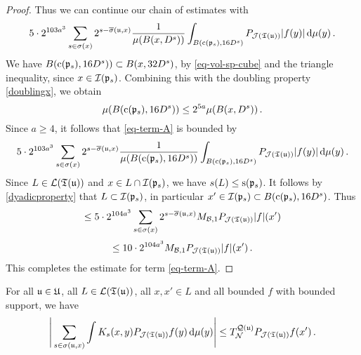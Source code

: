 \begin{proof}
    Thus we can continue our chain of estimates with
    $$
        5\cdot 2^{103a^3} \sum_{s\in\sigma(x)}2^{s - \overline{\sigma}({\mathfrak u}, x)} \frac{1}{\mu(B(x,D^s))}\int_{B({\mathrm{c}}({\mathfrak p}_s),16 D^s)}P_{\mathcal{J}({\mathfrak T}({\mathfrak u}))}|f(y)|\,\mathrm{d}\mu(y)\,.
    $$
    We have $B({\mathrm{c}}({\mathfrak p}_s), 16D^s)) \subset B(x, 32D^s)$, by \eqref{eq-vol-sp-cube} and the triangle inequality, since $x \in {\mathcal{I}}({\mathfrak p}_s)$. Combining this with the doubling property \eqref{doublingx}, we obtain
    $$
        \mu(B({\mathrm{c}}({\mathfrak p}_s), 16D^s)) \le 2^{5a} \mu(B(x, D^s))\,.
    $$
    Since $a \ge 4$, it follows that \eqref{eq-term-A} is bounded by
    $$
        5\cdot 2^{103a^3} \sum_{s\in\sigma(x)}2^{s - \overline{\sigma}({\mathfrak u}, x)} \frac{1}{\mu(B({\mathrm{c}}({\mathfrak p}_s),16D^s))}\int_{B({\mathrm{c}}({\mathfrak p}_s),16D^s)}P_{\mathcal{J}({\mathfrak T}({\mathfrak u}))}|f(y)|\,\mathrm{d}\mu(y)\,.
    $$
    Since $L \in \mathcal{L}({\mathfrak T}({\mathfrak u}))$ and $x\in L \cap {\mathcal{I}}({\mathfrak p}_s)$, we have $s(L) \le {\mathrm{s}}({\mathfrak p}_s)$. It follows by \eqref{dyadicproperty} that $L \subset {\mathcal{I}}({\mathfrak p}_s)$, in particular $x' \in {\mathcal{I}}({\mathfrak p}_s) \subset B({\mathrm{c}}({\mathfrak p}_s), 16D^s)$. Thus
    $$
        \le 5\cdot 2^{104a^3} \sum_{s\in\sigma(x)}2^{s - \overline{\sigma}({\mathfrak u}, x)} M_{\mathcal{B}, 1}P_{\mathcal{J}({\mathfrak T}({\mathfrak u}))}|f|(x')
    $$
    $$
        \le 10\cdot 2^{104a^3} M_{\mathcal{B}, 1}P_{\mathcal{J}({\mathfrak T}({\mathfrak u}))}|f|(x')\,.
    $$
    This completes the estimate for term \eqref{eq-term-A}.
\end{proof}

\begin{lemma}
    \label{second-tree-pointwise}
    \leanok
    For all ${\mathfrak u} \in {\mathfrak U}$, all $L \in \mathcal{L}({\mathfrak T}({\mathfrak u}))$, all $x, x' \in L$ and all bounded $f$ with bounded support, we have
    $$
         \Bigg| \sum_{s \in \sigma({\mathfrak u}, x)} \int K_s(x,y) P_{\mathcal{J}({\mathfrak T}({\mathfrak u}))} f(y) \, \mathrm{d}\mu(y) \Bigg| \le T_{\mathcal{N}}^{{\mathcal{Q}}({\mathfrak u})} P_{\mathcal{J}({\mathfrak T}({\mathfrak u}))} f(x')\,.
    $$
\end{lemma}

